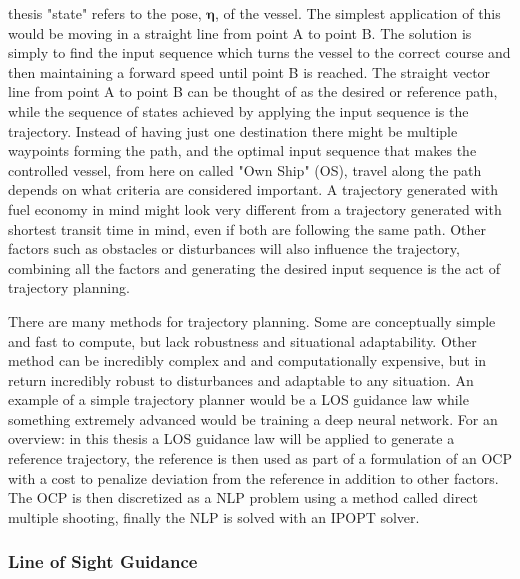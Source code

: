 thesis "state" refers to the pose, $\bm{\eta}$, of the vessel. The simplest application of this would be moving in a straight line from point A to point B.
The solution is simply to find the input sequence which turns the vessel to the correct course and then maintaining a forward speed until point B is reached.
The straight vector line from point A to point B can be thought of as the desired or reference path, while the sequence of states achieved by applying the 
input sequence is the trajectory. Instead of having just one destination there might be multiple waypoints forming the path, and the optimal
input sequence that makes the controlled vessel, from here on called "Own Ship" (OS), travel along the path depends on what criteria are considered important. A trajectory generated with fuel
economy in mind might look very different from a trajectory generated with shortest transit time in mind, even if both are following the same path.
Other factors such as obstacles or disturbances will also influence the trajectory, combining all the factors and generating the desired
input sequence is the act of trajectory planning.

There are many methods for trajectory planning. Some are conceptually simple and fast to compute, but lack robustness and situational adaptability.
Other method can be incredibly complex and and computationally expensive, but in return incredibly robust to disturbances and adaptable to
any situation. An example of a simple trajectory planner would be a \gls{LOS} guidance law while something extremely advanced would be training a deep
neural network. For an overview: in this thesis a \gls{LOS} guidance law will be applied to generate a reference trajectory, the reference is then used as part of a
formulation of an \gls{OCP} with a cost to penalize deviation from the reference in addition to other factors. The \gls{OCP} is then discretized
as a \gls{NLP} problem using a method called direct multiple shooting, finally the \gls{NLP} is solved with an \gls{IPOPT} solver.

\subsubsection*{Line of Sight Guidance} %

